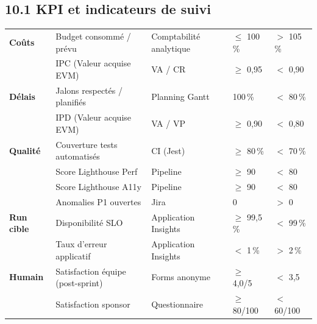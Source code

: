 \documentclass[11pt,a4paper,oneside]{report}
\begin{document}
\subsection*{10.1 KPI et indicateurs de suivi}
\renewcommand{\arraystretch}{1.3}
\begin{tabularx}{\textwidth}{L{1.6cm} L{4cm} L{3.5cm} C{2cm} C{2cm}}
\toprule
{} &  &  &  &  \\
\midrule
\textbf{Coûts}          & Budget consommé / prévu     & Comptabilité analytique & $\leq$ 100\,\% & $>$ 105\,\% \\
                        & IPC (Valeur acquise EVM)    & VA / CR                 & $\geq$ 0{,}95   & $<$ 0{,}90 \\
\cmidrule(lr){2-5}
\textbf{Délais}         & Jalons respectés / planifiés & Planning Gantt          & 100\,\%       & $<$ 80\,\% \\
                        & IPD (Valeur acquise EVM)    & VA / VP                 & $\geq$ 0{,}90  & $<$ 0{,}80 \\
\cmidrule(lr){2-5}
\textbf{Qualité}        & Couverture tests automatisés  & CI (Jest)        & $\geq$ 80\,\%  & $<$ 70\,\% \\
                        & Score Lighthouse Perf         & Pipeline         & $\geq$ 90      & $<$ 80 \\
                        & Score Lighthouse A11y         & Pipeline         & $\geq$ 90      & $<$ 80 \\
                        & Anomalies P1 ouvertes         & Jira             & 0              & $>$ 0 \\
\cmidrule(lr){2-5}
\textbf{Run cible}      & Disponibilité SLO            & Application Insights & $\geq$ 99{,}5\,\% & $<$ 99\,\% \\
                        & Taux d'erreur applicatif      & Application Insights & $<$ 1\,\%        & $>$ 2\,\% \\
\cmidrule(lr){2-5}
\textbf{Humain}         & Satisfaction équipe (post-sprint) & Forms anonyme & $\geq$ 4{,}0/5 & $<$ 3{,}5 \\
                        & Satisfaction sponsor             & Questionnaire & $\geq$ 80/100 & $<$ 60/100 \\
\bottomrule
\end{tabularx}
\end{document}
